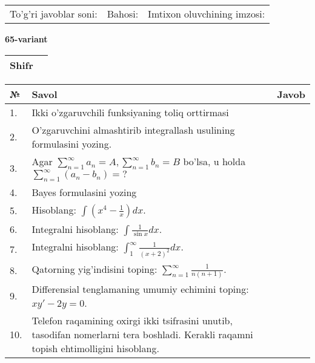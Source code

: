 \documentclass{article}
\begin{document}
  \vspace{1cm}
  
  \begin{tabular}{lll}
  To'g'ri javoblar soni: \underline{\hspace{1.5cm}} & 
  Bahosi: \underline{\hspace{1.5cm}} & 
  Imtixon oluvchining imzosi: \underline{\hspace{2cm}} \\
  \end{tabular}
  
  \egroup
  
  \newpage
  
  
  \textbf{65-variant}\\
  
  \bgroup
  \def\arraystretch{1.6} %
  
  \begin{tabular}{|m{5.7cm}|m{9.5cm}|}
  \hline
  Shifr & \\
  \hline
  \end{tabular}
  
  \vspace{1cm}
  
  \begin{tabular}{|m{0.7cm}|m{10cm}|m{4cm}|}
  \hline
  № & Savol & Javob \\
  \hline
  1. & Ikki o'zgaruvchili funksiyaning toliq orttirmasi &  \\
  \hline
  2. & O'zgaruvchini almashtirib integrallash usulining formulasini yozing. &  \\
  \hline
  3. & Agar \(\sum_{n = 1}^{\infty}a_{n} = A,\sum_{n = 1}^{\infty}b_{n} = B\) bo'lsa, u holda \(\sum_{n = 1}^{\infty}\left( a_{n} - b_{n} \right) = ?\) &  \\
  \hline
  4. & Bayes formulasini yozing &  \\
  \hline
  5. & Hisoblang: \(\int \left( x^{4} - \frac{1}{x} \right)dx\). &  \\
  \hline
  6. & Integralni hisoblang: \(\int {\frac{1}{\sin x}dx}\). &  \\
  \hline
  7. & Integralni hisoblang: \(\int_{1}^{\infty}{\frac{1}{(x + 2)^{2}}dx}\). &  \\
  \hline
  8. & Qatorning yig'indisini toping: \(\sum_{n = 1}^{\infty}\frac{1}{n(n + 1)}\). &  \\
  \hline
  9. & Differensial tenglamaning umumiy echimini toping: \(xy' - 2y = 0\). &  \\
  \hline
  10. & Telefon raqamining oxirgi ikki tsifrasini unutib, tasodifan nomerlarni tera boshladi. Kerakli raqamni topish ehtimolligini hisoblang. &  \\
  \hline
  \end{tabular}
  
\end{document}
